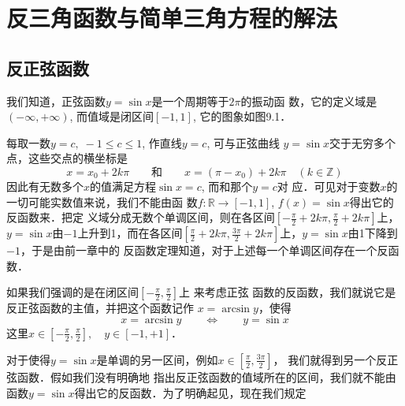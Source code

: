 \chapter{反三角函数与简单三角方程的解法}
\section{反正弦函数}
我们知道，正弦函数$y=\sin x$是一个周期等于$2\pi$的振动函
数，它的定义域是$(-\infty,+\infty)$, 而值域是闭区间$[-1,1]$, 它的图象如图9.1．

\begin{figure}[htp]
    \centering
{}
    \caption{}
\end{figure}


每取一数$y=c,\; -1\le c\le 1$, 作直线$y=c$, 可与正弦曲线
$y=\sin x$交于无穷多个点，这些交点的横坐标是
\[x=x_0+2k\pi\qquad \text{和}\qquad x=(\pi -x_0)+2k\pi\quad (k\in\mathbb{Z})\]
因此有无数多个$x$的值满足方程$\sin x =c$, 而和那个$y=c$对
应．可见对于变数$x$的一切可能实数值来说，我们不能由函
数$f:\mathbb{R}\to [-1,1]$, $f(x)=\sin x$得出它的反函数来．把定
义域分成无数个单调区间，则在各区间$\left[-\frac{\pi}{2}+2k\pi, \frac{\pi}{2}+2k\pi\right]$上，$y=\sin x$由$-1$上升到1，而在各区间$\left[\frac{\pi}{2}+2k\pi, \frac{3\pi}{2}+2k\pi\right]$上，$y=\sin x$由1下降到$-1$，于是由前一章中的
反函数定理知道，对于上述每一个单调区间存在一个反函数．

如果我们强调的是在闭区间$\left[-\frac{\pi}{2},\frac{\pi}{2}\right]$上
来考虑正弦
函数的反函数，我们就说它是反正弦函数的主值，并把这个函数记作
$x=\arcsin y$，使得
$$x=\arcsin y\qquad \Longleftrightarrow \qquad y=\sin x$$
这里$x\in \left[-\frac{\pi}{2},\frac{\pi}{2}\right],\quad y\in[-1,+1]$．

对于使得$y=\sin x$是单调的另一区间，例如$x\in \left[\frac{\pi}{2},\frac{3\pi}{2}\right]$，
我们就得到另一个反正弦函数．假如我们没有明确地
指出反正弦函数的值域所在的区间，我们就不能由函数$y=\sin x$得出它的反函数．为了明确起见，现在我们规定

